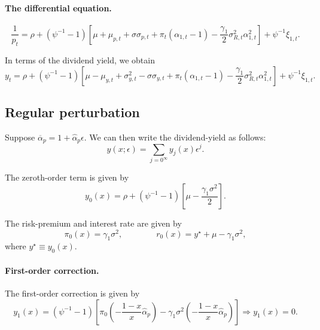 \documentclass[11pt,english]{article}
\begin{document}
\paragraph{The differential equation.}

\begin{equation}
    \frac{1}{p_t} =  \rho + (\psi^{-1}-1) \left[\mu+\mu_{p,t} + \sigma \sigma_{p,t} + \pi_t (\alpha_{1,t}-1) - \frac{\gamma_1}{2} \sigma_{R,t}^2 \alpha_{1,t}^2 \right] + \psi^{-1}\xi_{1,t}.
\end{equation}

In terms of the dividend yield, we obtain
\begin{equation}
    y_t =  \rho + (\psi^{-1}-1) \left[ \mu-\mu_{y,t}+\sigma_{y,t}^2 - \sigma \sigma_{y,t} + \pi_t (\alpha_{1,t}-1) - \frac{\gamma_1}{2} \sigma_{R,t}^2 \alpha_{1,t}^2 \right] + \psi^{-1}\xi_{1,t}.
\end{equation}


\subsection{Regular perturbation}

Suppose $\overline{\alpha}_p = 1 + \hat{\alpha}_p \epsilon$. We can then write the dividend-yield  as follows:
\begin{equation}
    y(x;\epsilon) = \sum_{j=0^\infty} y_{j}(x) \epsilon^j.
\end{equation}

The zeroth-order term is given by
\begin{equation}
    y_0(x) =  \rho + \left(\psi^{-1}-1\right) \left[\mu - \frac{\gamma_1 \sigma^2}{2}  \right].  
\end{equation}

The risk-premium and interest rate are given by
\begin{equation}
    \pi_0(x) = \gamma_1 \sigma^2, \qquad \qquad 
    r_0(x) = y^\star + \mu  - \gamma_1 \sigma^2,
\end{equation}
where $y^\star \equiv y_0(x)$.

\paragraph{First-order correction.} The first-order correction is given by
\begin{equation}
    y_1(x) = (\psi^{-1}-1) \left[ \pi_0\left( -\frac{1-x}{x} \hat{\alpha}_p \right) - \gamma_1 \sigma^2 \left( - \frac{1-x}{x} \hat{\alpha}_p\right) \right] \Rightarrow y_1(x) = 0.
\end{equation}
\end{document}

